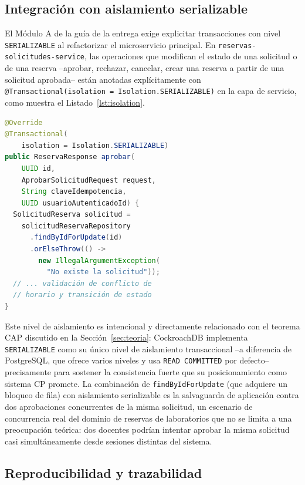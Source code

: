 \documentclass[10pt,twocolumn]{article}
\begin{document}
\subsection{Integración con aislamiento serializable}
\label{sec:serializable}

El Módulo A de la guía de la entrega exige explicitar transacciones con
nivel \texttt{SERIALIZABLE} al refactorizar el microservicio principal.
En \texttt{reservas-solicitudes-service}, las operaciones que modifican el
estado de una solicitud o de una reserva --aprobar, rechazar, cancelar,
crear una reserva a partir de una solicitud aprobada-- están anotadas
explícitamente con \texttt{@Transactional(isolation =
  Isolation.SERIALIZABLE)} en la capa de servicio, como muestra el
Listado~\ref{lst:isolation}.

\begin{lstlisting}[language=Java,caption={Transacción serializable en la aprobación de una solicitud (\texttt{SolicitudReservaServiceImpl.java}).},label={lst:isolation}]
@Override
@Transactional(
    isolation = Isolation.SERIALIZABLE)
public ReservaResponse aprobar(
    UUID id,
    AprobarSolicitudRequest request,
    String claveIdempotencia,
    UUID usuarioAutenticadoId) {
  SolicitudReserva solicitud =
    solicitudReservaRepository
      .findByIdForUpdate(id)
      .orElseThrow(() ->
        new IllegalArgumentException(
          "No existe la solicitud"));
  // ... validación de conflicto de
  // horario y transición de estado
}
\end{lstlisting}

Este nivel de aislamiento es intencional y directamente relacionado con el
teorema CAP discutido en la Sección~\ref{sec:teoria}: CockroachDB
implementa \texttt{SERIALIZABLE} como su único nivel de aislamiento
transaccional --a diferencia de PostgreSQL, que ofrece varios niveles y usa
\texttt{READ COMMITTED} por defecto-- precisamente para sostener la
consistencia fuerte que su posicionamiento como sistema CP promete. La
combinación de \texttt{findByIdForUpdate} (que adquiere un bloqueo de fila)
con aislamiento serializable es la salvaguarda de aplicación contra dos
aprobaciones concurrentes de la misma solicitud, un escenario de
concurrencia real del dominio de reservas de laboratorios que no se limita
a una preocupación teórica: dos docentes podrían intentar aprobar la misma
solicitud casi simultáneamente desde sesiones distintas del sistema.

\subsection{Reproducibilidad y trazabilidad}
\end{document}
